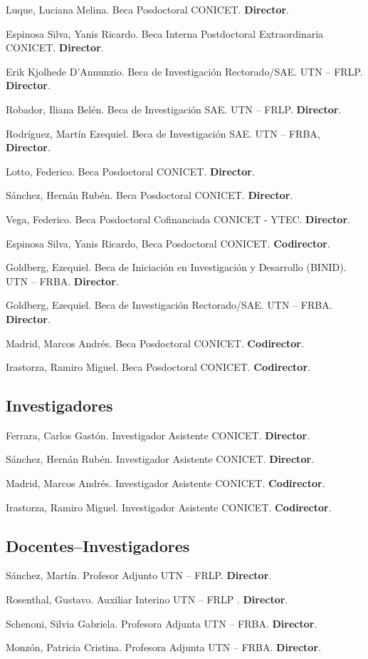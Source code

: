      Luque, Luciana Melina. Beca Posdoctoral CONICET. \textbf{Director}. 

     Espinosa Silva, Yanis Ricardo. Beca Interna Postdoctoral Extraordinaria CONICET. \textbf{Director}.

     Erik Kjolhede D'Annunzio. Beca de Investigación Rectorado/SAE. UTN -- FRLP. \textbf{Director}.

     Robador, Iliana Belén. Beca de Investigación SAE. UTN -- FRLP. \textbf{Director}.

     Rodríguez, Martín Ezequiel. Beca de Investigación SAE. UTN -- FRBA, \textbf{Director}.

     Lotto, Federico. Beca Posdoctoral CONICET. \textbf{Director}.

     Sánchez, Hernán Rubén. Beca Posdoctoral CONICET. \textbf{Director}.

     Vega, Federico. Beca Posdoctoral Cofinanciada CONICET - YTEC. \textbf{Director}.

     Espinosa Silva, Yanis Ricardo, Beca Posdoctoral CONICET. \textbf{Codirector}.

     Goldberg, Ezequiel. Beca de Iniciación en Investigación y Desarrollo (BINID). UTN -- FRBA. \textbf{Director}.

     Goldberg, Ezequiel. Beca de Investigación Rectorado/SAE. UTN -- FRBA. \textbf{Director}.

     Madrid, Marcos Andrés. Beca Posdoctoral CONICET. \textbf{Codirector}.

     Irastorza, Ramiro Miguel. Beca Posdoctoral CONICET. \textbf{Codirector}.

\subsection{Investigadores}
 Ferrara, Carlos Gastón. Investigador Asistente CONICET. \textbf{Director}.

 Sánchez, Hernán Rubén. Investigador Asistente CONICET. \textbf{Director}.

     Madrid, Marcos Andrés. Investigador Asistente CONICET. \textbf{Codirector}.

     Irastorza, Ramiro Miguel. Investigador Asistente CONICET. \textbf{Codirector}.
  
\subsection{Docentes--Investigadores}
 Sánchez, Martín. Profesor Adjunto UTN -- FRLP. \textbf{Director}.
  
   Rosenthal, Gustavo. Auxiliar Interino UTN -- FRLP . \textbf{Director}.
  
   Schenoni, Silvia Gabriela. Profesora Adjunta UTN -- FRBA. \textbf{Director}.
  
   Monzón, Patricia Cristina. Profesora Adjunta UTN -- FRBA. \textbf{Director}.
  

